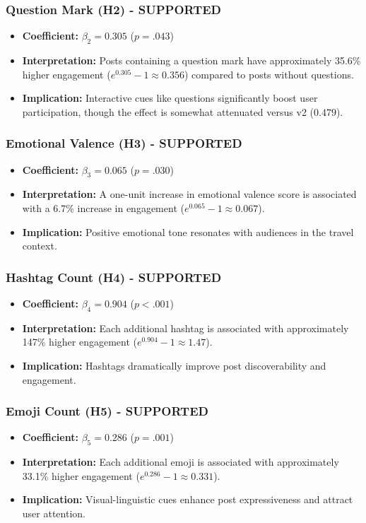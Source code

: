 \documentclass[12pt,a4paper]{article}
\begin{document}
\subsubsection{Question Mark (H2) - SUPPORTED}
\begin{itemize}
    \item \textbf{Coefficient:} $\beta_2 = 0.305$ ($p = .043$)
    \item \textbf{Interpretation:} Posts containing a question mark have approximately 35.6\% higher engagement ($e^{0.305} - 1 \approx 0.356$) compared to posts without questions.
    \item \textbf{Implication:} Interactive cues like questions significantly boost user participation, though the effect is somewhat attenuated versus v2 ($0.479$).
\end{itemize}

\subsubsection{Emotional Valence (H3) - SUPPORTED}
\begin{itemize}
    \item \textbf{Coefficient:} $\beta_3 = 0.065$ ($p = .030$)
    \item \textbf{Interpretation:} A one-unit increase in emotional valence score is associated with a 6.7\% increase in engagement ($e^{0.065} - 1 \approx 0.067$).
    \item \textbf{Implication:} Positive emotional tone resonates with audiences in the travel context.
\end{itemize}

\subsubsection{Hashtag Count (H4) - SUPPORTED}
\begin{itemize}
    \item \textbf{Coefficient:} $\beta_4 = 0.904$ ($p < .001$)
    \item \textbf{Interpretation:} Each additional hashtag is associated with approximately 147\% higher engagement ($e^{0.904} - 1 \approx 1.47$).
    \item \textbf{Implication:} Hashtags dramatically improve post discoverability and engagement.
\end{itemize}

\subsubsection{Emoji Count (H5) - SUPPORTED}
\begin{itemize}
    \item \textbf{Coefficient:} $\beta_5 = 0.286$ ($p = .001$)
    \item \textbf{Interpretation:} Each additional emoji is associated with approximately 33.1\% higher engagement ($e^{0.286} - 1 \approx 0.331$).
    \item \textbf{Implication:} Visual-linguistic cues enhance post expressiveness and attract user attention.
\end{itemize}
\end{document}
